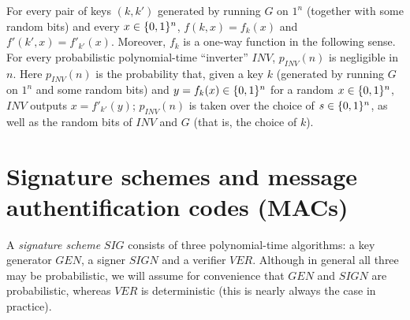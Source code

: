 For every pair of keys $(k,k')$ generated by running $G$ on $1^n$ (together
with some random bits) and every $x \in \{0,1\}^{n}$, $f(k,x) = f_k(x)$ and
$f'(k',x) = f'_{k'}(x)$.  Moreover, $f_k$ is a one-way function in the
following sense.  For every probabilistic polynomial-time ``inverter'' $INV$,
$p_{INV}(n)$ is negligible in $n$. Here $p_{INV}(n)$ is the probability that,
given a key $k$ (generated by running $G$ on $1^n$ and some random bits) and
$y = f_k(x) \in \{0,1\}^{n}$ for a random $x \in \{0,1\}^{n}$, $INV$ outputs $x =
f'_{k'}(y)$; 
$p_{INV}(n)$ is taken over the choice of $s \in \{0,1\}^{n}$, as well as the
random bits of $INV$ and $G$ (that is, the choice of $k$).
%
%
%
%
%
%
%

\section{Signature schemes and message authentification codes (MACs)}
\label{SEC:Signatures}
A {\it signature scheme} $SIG$ consists of three polynomial-time algorithms: a
key generator $GEN$, a signer $SIGN$ and a verifier $VER$.  Although in general
all three may be probabilistic, we will assume for convenience that
$GEN$ and $SIGN$ are probabilistic, whereas $VER$ is deterministic (this is
nearly always the case in practice). 

